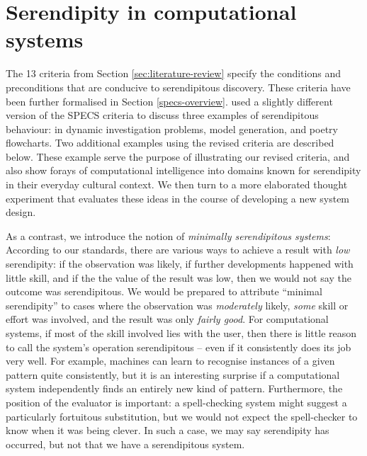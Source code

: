 \section{Serendipity in computational systems} \label{sec:computational-serendipity}

The 13 criteria from Section \ref{sec:literature-review} specify the
conditions and preconditions that are conducive to serendipitous
discovery.  These criteria have been further formalised
in Section \ref{specs-overview}.
% 
 used a slightly different version of the
SPECS criteria to discuss three examples of serendipitous behaviour:
in dynamic investigation problems, model generation, and poetry
flowcharts.  Two additional examples using the revised criteria are
described below.  These example serve the purpose of illustrating our
revised criteria, and also show forays of computational intelligence
into domains known for serendipity in their everyday cultural context.
We then turn to a more elaborated thought experiment that evaluates
these ideas in the course of developing a new system design.  

As a contrast, we introduce the notion of \emph{minimally serendipitous systems}: According to our standards, there are various ways to achieve a result with \emph{low} serendipity: if the observation was likely, if further
developments happened with little skill, and if the the value of the
result was low, then we would not say the outcome was serendipitous.
We would be prepared to attribute ``minimal serendipity'' to cases
where the observation was \emph{moderately} likely, \emph{some} skill
or effort was involved, and the result was only \emph{fairly good}.
For computational systems, if most of the skill involved lies with the
user, then there is little reason to call the system's operation
serendipitous -- even if it consistently does its job very well.  For
example, machines can learn to recognise instances of a given pattern
quite consistently, but it is an interesting surprise if a
computational system independently finds an entirely new kind of
pattern.  Furthermore, the position of the evaluator is important: a
spell-checking system might suggest a particularly fortuitous
substitution, but we would not expect the spell-checker to know when
it was being clever.  In such a case, we may say serendipity has
occurred, but not that we have a serendipitous system.

